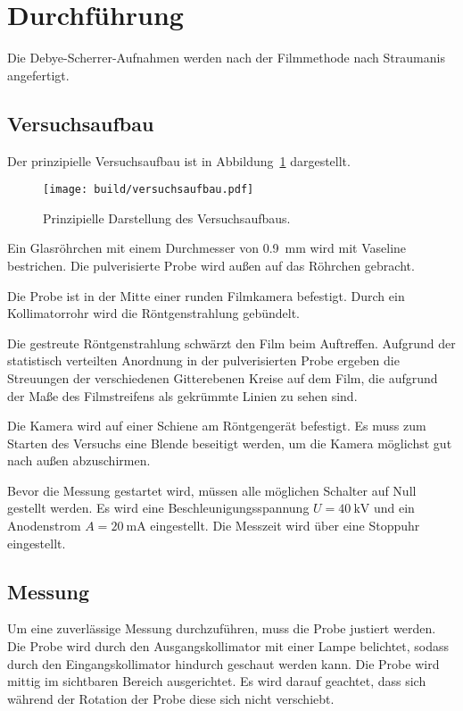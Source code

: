 \section{Durchführung}%
\label{sec:Durchführung}
Die Debye-Scherrer-Aufnahmen werden nach der Filmmethode nach Straumanis angefertigt.

\subsection{Versuchsaufbau}%
\label{sub:versuchsaufbau}
Der prinzipielle Versuchsaufbau ist in Abbildung~\ref{fig:versuchsaufbau} dargestellt.
\begin{figure}
  \centering
  \texttt{[image: build/versuchsaufbau.pdf]}
  \caption{Prinzipielle Darstellung des Versuchsaufbaus.\cite{anleitung}}%
  \label{fig:versuchsaufbau}
\end{figure}

Ein Glasröhrchen mit einem Durchmesser von \SI{0.9}{\milli\meter} wird mit Vaseline bestrichen.
Die pulverisierte Probe wird außen auf das Röhrchen gebracht.

Die Probe ist in der Mitte einer runden Filmkamera befestigt.
Durch ein Kollimatorrohr wird die Röntgenstrahlung gebündelt.

Die gestreute Röntgenstrahlung schwärzt den Film beim Auftreffen.
Aufgrund der statistisch verteilten Anordnung in der pulverisierten Probe
ergeben die Streuungen der verschiedenen Gitterebenen Kreise auf dem Film,
die aufgrund der Maße des Filmstreifens als gekrümmte Linien zu sehen sind.

Die Kamera wird auf einer Schiene am Röntgengerät befestigt.
Es muss zum Starten des Versuchs eine Blende beseitigt werden, um die Kamera
möglichst gut nach außen abzuschirmen.

Bevor die Messung gestartet wird, müssen alle möglichen Schalter auf Null gestellt werden.
Es wird eine Beschleunigungsspannung $U = \SI{40}{\kilo\volt}$ und ein
Anodenstrom $A = \SI{20}{\milli\ampere}$ eingestellt.
Die Messzeit wird über eine Stoppuhr eingestellt.


\subsection{Messung}%
\label{sub:messung}
Um eine zuverlässige Messung durchzuführen, muss die Probe justiert werden.
Die Probe wird durch den Ausgangskollimator mit einer Lampe belichtet,
sodass durch den Eingangskollimator hindurch geschaut werden kann.
Die Probe wird mittig im sichtbaren Bereich ausgerichtet.
Es wird darauf geachtet, dass sich während der Rotation der Probe diese sich nicht verschiebt.

